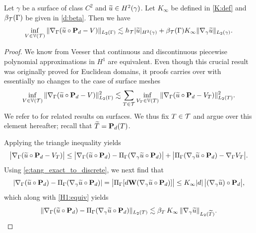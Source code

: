 \begin{lemma}\label{L:approxH1}
Let $\gamma$ be a surface of class $C^2$ and $\widetilde{u} \in H^2(\gamma)$. Let
$K_\infty$ be defined in \eqref{K:def} and $\beta_{\mathcal{T}}(\Gamma)$ be given in \eqref{d:beta}.
Then we have
\begin{equation}
\label{opt_approx}
\inf_{V \in \mathbb{V}(\mathcal{T})} \|\nabla_\Gamma(\widetilde{u} \circ {\bf P}_d -V)\|_{L_2(\Gamma)}
\lesssim h_{\mathcal{T}} |\widetilde{u}|_{H^2(\gamma)}+\beta_{\mathcal{T}}(\Gamma) K_\infty \|\nabla_\gamma \widetilde{u}\|_{L_2(\gamma)}.
\end{equation}
\end{lemma}
%
\begin{proof}
We know from Veeser \cite{Vee15} that continuous and discontinuous
piecewise polynomial approximations in $H^1$ are equivalent.
 Even though this crucial result was originally
proved for Euclidean domains, it proofs carries over with essentially no changes
to the case of surface meshes
%
\begin{equation}
\label{local_gradient}
\inf_{V \in \mathbb{V}(\mathcal{T})} \|\nabla_\Gamma(\widetilde{u} \circ {\bf P}_d -V)\|_{L_2(\Gamma)}^2 \lesssim \sum_{T \in \mathcal{T}} \inf_{V_T \in \mathbb{V}(T)} \|\nabla_\Gamma(\widetilde{u} \circ {\bf P}_d-V_T)\|_{L_2(T)}^2.
\end{equation}
%
We refer to \cite{CD15} for related results on surfaces. We thus fix $T\in\mathcal{T}$
and argue over this element hereafter; recall that $\widetilde{T}={\bf P}_d(T)$.

Applying the triangle inequality yields
%
$$
\big|\nabla_\Gamma(\widetilde{u} \circ {\bf P}_d-V_T) \big| \le
\big| \nabla_\Gamma(\widetilde{u} \circ {\bf P}_d)-\Pi_\Gamma (\nabla_\gamma \widetilde{u} \circ {\bf P}_d) \big|
+ \big| \Pi_\Gamma (\nabla_\gamma \widetilde{u} \circ {\bf P}_d) -\nabla_\Gamma V_T \big|.
$$
Using \eqref{e:tang_exact_to_discrete}, we next find that
$$|\nabla_\Gamma(\widetilde{u} \circ {\bf P}_d)-\Pi_\Gamma (\nabla_\gamma \widetilde{u} \circ {\bf P}_d)|=
\big|\Pi_\Gamma [d {\bf W}  (\nabla_\gamma \widetilde{u} \circ {\bf P}_d)]\big| \le
K_\infty|d| \, \big|(\nabla_\gamma \widetilde{u}) \circ {\bf P}_d \big|,$$
which along with \eqref{H1:equiv} yields
%
$$
\| \nabla_\Gamma(\widetilde{u} \circ {\bf P}_d)-\Pi_\Gamma (\nabla_\gamma \widetilde{u} \circ {\bf P}_d)\|_{L_2(T)}
\lesssim \beta_T \, K_\infty \, \|\nabla_\gamma \widetilde{u}\|_{L_2(\widetilde{T})}.
$$


\end{proof}
